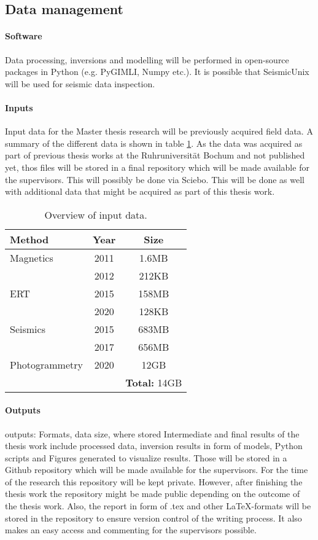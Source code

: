 \subsection{Data management}\label{section:Data_management}

\paragraph*{Software}
Data processing, inversions and modelling will be performed in open-source packages in Python (e.g. PyGIMLI, Numpy etc.). It is possible that SeismicUnix will be used for seismic data inspection.

\paragraph*{Inputs}
Input data for the Master thesis research will be previously acquired field data. A summary of the different data is shown in table \ref{table:Input_data}. As the data was acquired as part of previous thesis works at the Ruhruniversität Bochum and not published yet, thos files will be stored in a final repository which will be made available for the supervisors. This will possibly be done via Sciebo. This will be done as well with additional data that might be acquired as part of this thesis work.

\begin{table}[!htb]
\caption{Overview of input data.}
\centering
\begin{tabular}{lcc}
\hline 
\textbf{Method} & \textbf{Year} & \textbf{Size}  \\ \hline 
Magnetics & 2011 & 1.6MB\\
& 2012 & 212KB\\
ERT & 2015 & 158MB\\
& 2020 & 128KB\\
Seismics & 2015 & 683MB\\
& 2017 & 656MB\\
Photogrammetry & 2020 & 12GB\\
& & \textbf{Total:} 14GB\\
 \hline 
\end{tabular}
\label{table:Input_data}
\end{table}

\paragraph*{Outputs}outputs: Formats, data size, where stored
Intermediate and final results of the thesis work include processed data, inversion results in form of models, Python scripts and Figures generated to visualize results. Those will be stored in a Github repository which will be made available for the supervisors. For the time of the research this repository will be kept private. However, after finishing the thesis work the repository might be made public depending on the outcome of the thesis work. Also, the report in form of .tex and other \LaTeX-formats will be stored in the repository to ensure version control of the writing process. It also makes an easy access and commenting for the supervisors possible.
